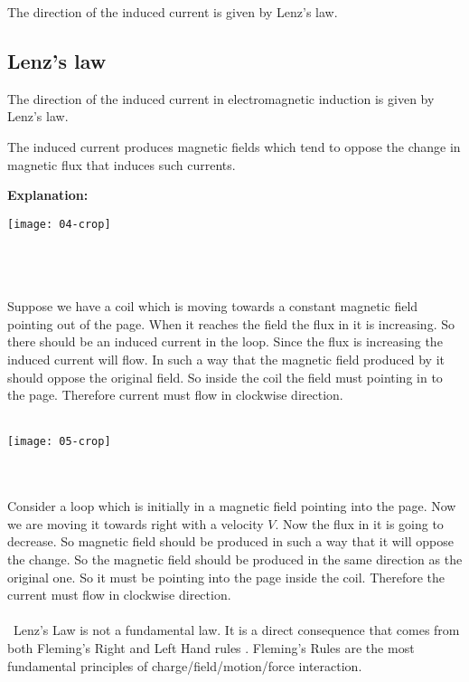 The direction of the induced current is given by Lenz's law.
\subsection{Lenz's law }
The direction of the induced current in electromagnetic induction is given by Lenz's law.\\
\begin{definition}
The induced current produces magnetic fields which tend to oppose the change in magnetic flux that induces such currents.\\
\end{definition}
\textbf{\large Explanation:}\\
\begin{minipage}{.60\textwidth}
	\begin{center}
		\texttt{[image: 04-crop]}
	\end{center}
\end{minipage}\\\\\\
Suppose we have a coil which is moving towards a constant magnetic field pointing out of the page. When it reaches the field the flux in it is increasing. So there should be an induced current in the loop. Since the flux is increasing the induced current will flow. In such a way that the magnetic field produced by it should oppose the original field. So inside the coil the field must pointing in to the page. Therefore current must flow in clockwise direction.\\\\
\begin{minipage}{.60\textwidth}
	\begin{center}
		\texttt{[image: 05-crop]}
	\end{center}
\end{minipage}\\\\
Consider a loop which is initially in a magnetic field pointing into the page. Now we are moving it towards right with a velocity $V$. Now the flux in it is going to decrease. So magnetic field should be produced in such a way that it will oppose the change. So the magnetic field should be produced in the same direction as the original one. So it must be pointing into the page inside the coil. Therefore the current must flow in clockwise direction.\\\\\	Lenz's Law is not a fundamental law. It is a direct consequence that comes from both Fleming's Right and Left Hand rules . Fleming's Rules are the most fundamental principles of charge/field/motion/force interaction.
